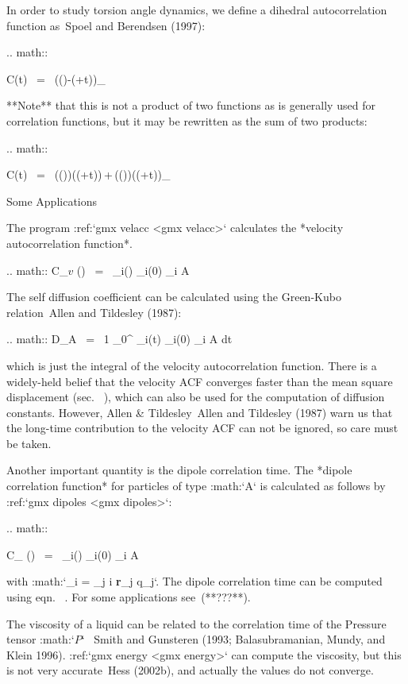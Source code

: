 In order to study torsion angle dynamics, we define a dihedral
autocorrelation function as Spoel and Berendsen (1997):

.. math::

   C(t)    ~=~     \left\langle \cos(\theta(\tau)-\theta(\tau+t))\right\rangle_{\tau}
   \label{eqn:coenk}

**Note** that this is not a product of two functions as is generally
used for correlation functions, but it may be rewritten as the sum of
two products:

.. math::

   C(t)    ~=~     \left\langle\cos(\theta(\tau))\cos(\theta(\tau+t))\,+\,\sin(\theta(\tau))\sin(\theta(\tau+t))\right\rangle_{\tau}
   \label{eqn:cot}

Some Applications
~~~~~~~~~~~~~~~~~

The program :ref:`gmx velacc <gmx velacc>`
calculates the *velocity autocorrelation function*.

.. math:: C_{{\mbox{\boldmath ${v}$}}} (\tau) ~=~ _i(\tau) _i(0) \rangle_{i \in A}

The self diffusion coefficient can be calculated using the Green-Kubo
relation Allen and Tildesley (1987):

.. math:: D_A ~=~ {1} \int_0^{\infty} _i(t) _i(0) \rangle_{i \in A} \; dt

which is just the integral of the velocity autocorrelation function.
There is a widely-held belief that the velocity ACF converges faster
than the mean square displacement (sec. 
),
which can also be used for the computation of diffusion constants.
However, Allen & Tildesley Allen and Tildesley (1987) warn us that the
long-time contribution to the velocity ACF can not be ignored, so care
must be taken.

Another important quantity is the dipole correlation time. The *dipole
correlation function* for particles of type :math:`A` is calculated as
follows by :ref:`gmx dipoles <gmx dipoles>`:

.. math::

   C_{\mu} (\tau) ~=~
   \langle {\bf \mu}_i(\tau) \cdot {\bf \mu}_i(0) \rangle_{i \in A}

with :math:`{\bf \mu}_i = \sum_{j \in i} {\bf r}_j q_j`. The dipole
correlation time can be computed using
eqn. 
. For some applications
see (**???**).

The viscosity
of a liquid can be related
to the correlation time of the Pressure tensor
:math:`{\mbox{\boldmath ${P}$}}`  Smith and Gunsteren (1993;
Balasubramanian, Mundy, and Klein 1996). 
:ref:`gmx energy <gmx energy>`
can compute the viscosity, but
this is not very accurate Hess (2002b), and actually the values do not
converge.

